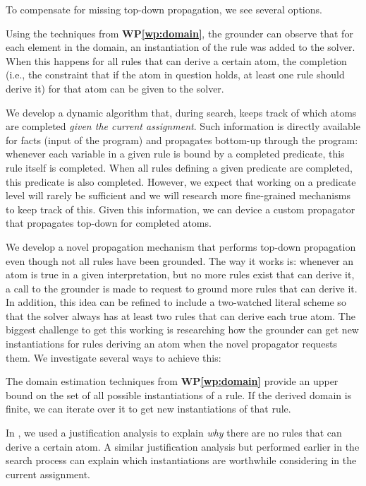 \documentclass[a4paper,11pt]{article}
\newcommand\WPref[1]{\textbf{WP\ref{#1}}}
\begin{document}
\begin{WP}\label{wp:topdown}
To compensate for missing top-down propagation, we see several options. 
\begin{compactenum}
 \item Using the techniques from \WPref{wp:domain}, the grounder can observe that for each element in the domain, an instantiation of the rule was added to the solver. When this happens for all rules that can derive a certain atom, the completion (i.e., the constraint that if the atom in question holds, at least one rule should derive it) for that atom can be given to the solver. 
 \item We develop a dynamic algorithm that, during search, keeps track of which atoms are completed \emph{given the current assignment}. Such information is directly available for facts (input of the program) and propagates bottom-up through the program: whenever each variable in a given rule is bound by a completed predicate, this rule itself is completed. When all rules defining a given predicate are completed, this predicate is also completed. 
 However, we expect that working on a predicate level will rarely be sufficient and we will research more fine-grained mechanisms to keep track of this. 
 Given this information, we can device a custom propagator that propagates top-down for completed atoms. 
 \item We develop a novel propagation mechanism that performs top-down propagation even though not all rules have been grounded. The way it works is: whenever an atom is true in a given interpretation, but no more rules exist that can derive it, a call to the grounder is made to request to ground more rules that can derive it. In addition, this idea can be refined to include a two-watched literal scheme so that the solver always has at least two rules that can derive each true atom. 
 The biggest challenge to get this working is researching how the grounder can get new instantiations for rules deriving an atom when the novel propagator requests them. We investigate several ways to achieve this:
 \begin{compactenum}
 \item The domain estimation techniques from \WPref{wp:domain} provide an upper bound on the set of all possible instantiations of a rule. If the derived domain is finite, we can iterate over it to get new instantiations of that rule. 
 \item In \cite{ijcai/BogaertsW18}, we used a justification analysis to explain \emph{why} there are no rules that can derive a certain atom. A similar justification analysis but performed earlier in the search process can explain which instantiations are worthwhile considering in the current assignment. 

\end{compactenum}
\end{compactenum}
\end{WP}
\end{document}
